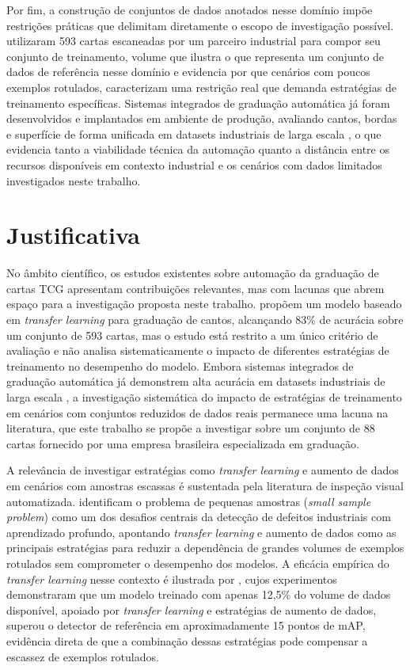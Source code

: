 \documentclass[
    12pt,                %
    openright,           %
    oneside,             %
    a4paper,             %
    english,             %
    brazil               %
]{abntex2}
\begin{document}
Por fim, a construção de conjuntos de dados anotados nesse domínio 
impõe restrições práticas que delimitam diretamente o escopo de 
investigação possível.  utilizaram 593 cartas 
escaneadas por um parceiro industrial para compor seu conjunto de 
treinamento, volume que ilustra o que representa um conjunto de dados 
de referência nesse domínio e evidencia por que cenários com poucos 
exemplos rotulados, caracterizam uma restrição real que demanda estratégias de 
treinamento específicas. Sistemas integrados de graduação automática 
já foram desenvolvidos e implantados em ambiente de produção, 
avaliando cantos, bordas e superfície de forma unificada em datasets 
industriais de larga escala \cite{Nahar2025b}, o que evidencia tanto 
a viabilidade técnica da automação quanto a distância entre os 
recursos disponíveis em contexto industrial e os cenários com dados 
limitados investigados neste trabalho.


\section{Justificativa}
\label{sec:justificativa}

No âmbito científico, os estudos existentes sobre automação da 
graduação de cartas TCG apresentam contribuições relevantes, mas com 
lacunas que abrem espaço para a investigação proposta neste trabalho. 
 propõem um modelo baseado em \textit{transfer 
learning} para graduação de cantos, alcançando 83\% de acurácia sobre 
um conjunto de 593 cartas, mas o estudo está restrito a um único 
critério de avaliação e não analisa sistematicamente o impacto de 
diferentes estratégias de treinamento no desempenho do modelo. 
Embora sistemas integrados de graduação automática já demonstrem alta 
acurácia em datasets industriais de larga escala \cite{Nahar2025b}, 
a investigação sistemática do impacto de estratégias de treinamento 
em cenários com conjuntos reduzidos de dados reais permanece uma 
lacuna na literatura, que este trabalho se propõe a investigar sobre 
um conjunto de 88 cartas fornecido por uma empresa brasileira 
especializada em graduação.

A relevância de investigar estratégias como 
\textit{transfer learning} e aumento de dados em cenários 
com amostras escassas é sustentada pela literatura de 
inspeção visual automatizada.  
identificam o problema de pequenas amostras 
(\textit{small sample problem}) como um dos desafios 
centrais da detecção de defeitos industriais com 
aprendizado profundo, apontando \textit{transfer learning}
e aumento de dados como as principais estratégias para
reduzir a dependência de grandes volumes de exemplos
rotulados sem comprometer o desempenho dos modelos.
A eficácia empírica do \textit{transfer learning} nesse
contexto é ilustrada por , cujos
experimentos demonstraram que um modelo treinado com apenas
12,5\% do volume de dados disponível, apoiado por
\textit{transfer learning} e estratégias de aumento de dados,
superou o detector de referência em aproximadamente 15 pontos
de mAP, evidência direta de que a combinação dessas
estratégias pode compensar a escassez de exemplos rotulados.
\end{document}

